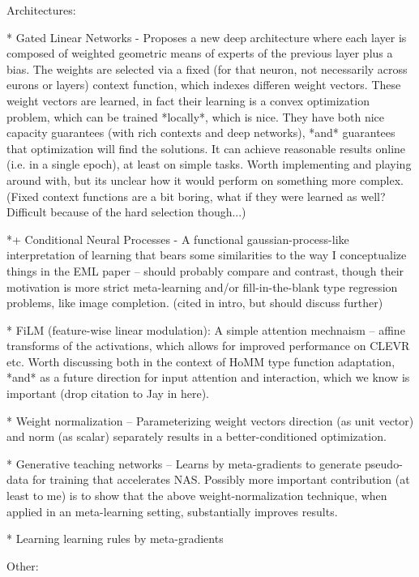 Architectures:

* Gated Linear Networks - Proposes a new deep architecture where each layer is composed of weighted geometric means of experts of the previous layer plus a bias. The weights are selected via a fixed (for that neuron, not necessarily across eurons or layers) context function, which indexes differen weight vectors. These weight vectors are learned, in fact their learning is a convex optimization problem, which can be trained *locally*, which is nice. They have both nice capacity guarantees (with rich contexts and deep networks), *and* guarantees that optimization will find the solutions. It can achieve reasonable results online (i.e. in a single epoch), at least on simple tasks. Worth implementing and playing around with, but its unclear how it would perform on something more complex. (Fixed context functions are a bit boring, what if they were learned as well? Difficult because of the hard selection though...) \citep{Veness2017} 

*+ Conditional Neural Processes - A functional gaussian-process-like interpretation of learning that bears some similarities to the way I conceptualize things in the EML paper -- should probably compare and contrast, though their motivation is more strict meta-learning and/or fill-in-the-blank type regression problems, like image completion. \citep{Garnelo2018}  (cited in intro, but should discuss further)

* FiLM (feature-wise linear modulation): A simple attention mechnaism -- affine transforms of the activations, which allows for improved performance on CLEVR etc. Worth discussing both in the context of HoMM type function adaptation, *and* as a future direction for input attention and interaction, which we know is important (drop citation to Jay in here). \citep{Perez2018}

* Weight normalization -- Parameterizing weight vectors direction (as unit vector) and norm (as scalar) separately results in a better-conditioned optimization. \citep{Salimans2016}

* Generative teaching networks -- Learns by meta-gradients to generate pseudo-data for training that accelerates NAS. Possibly more important contribution (at least to me) is to show that the above weight-normalization technique, when applied in an meta-learning setting, substantially improves results. \citep{Such2019}

* Learning learning rules by meta-gradients \citep{Miconi2019}


Other:

